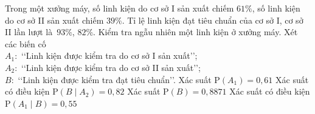 \begin{ex}%
	Trong một xưởng  máy, số linh kiện do cơ sở I sản xuất chiếm $61 \%$, số linh kiện do cơ sở II sản xuất chiếm $39 \%$. Tỉ lệ linh kiện đạt tiêu chuẩn của cơ sở I, cơ sở II lần lượt là~$93\%$, $82\%$. Kiểm tra ngẫu nhiên một linh kiện ở xưởng máy. Xét các biến cố\\
	$A_1 \colon$ \lq\lq  Linh kiện được kiểm tra do cơ sở I sản xuất\rq\rq;\\
	$A_2 \colon$ \lq\lq Linh kiện được kiểm tra  do cơ sở II sản xuất\rq\rq;\\
	$B \colon$ \lq\lq  Linh kiện được kiểm tra đạt tiêu chuẩn\rq\rq.
	\choiceTF 
		{\True  Xác suất $\mathrm{P}\left(A_1\right)=0{,}61$}
		{\True Xác suất có điều kiện $\mathrm{P}\left(B  \mid A_2\right)=0{,}82$}
		{\True Xác suất  $\mathrm{P}(B)=0{,}8871$}
		{Xác suất có điều kiện  $\mathrm{P}\left(A_1 \mid B\right)=0{,}55$}
\end{ex}

